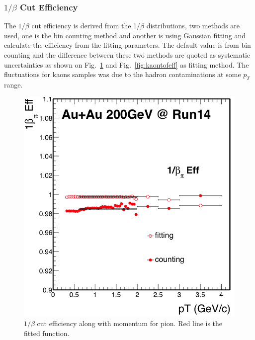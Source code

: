 \subsubsection{$1/\beta$ Cut Efficiency}
The $1/\beta$ cut efficiency is derived from the 1/$\beta$ distributions, two methods are used, one is the bin counting method and another is using Gaussian fitting and calculate the efficiency from the fitting parameters. The default value is from bin counting and the difference between these two methods are quoted as systematic uncertainties as shown on Fig.~\ref{fig:piontofeff} and Fig.~\ref{fig:kaontofeff} as fitting method. The fluctuations for kaons samples was due to the hadron contaminations at some $p_T$ range. 

\begin{figure}[htbp]
\begin{minipage}[htbp]{0.5\linewidth}
\centering
\includegraphics[width=1.0\textwidth]{figure/Run14_D0HFT/nSigPionTof_eff.png}
\caption{$1/\beta$ cut efficiency along with momentum for pion. Red line is the fitted function. \label{fig:piontofeff}}
\end{minipage}
\hfill
\begin{minipage}[htbp]{0.5\linewidth}
\centering

\end{minipage}
\end{figure}
